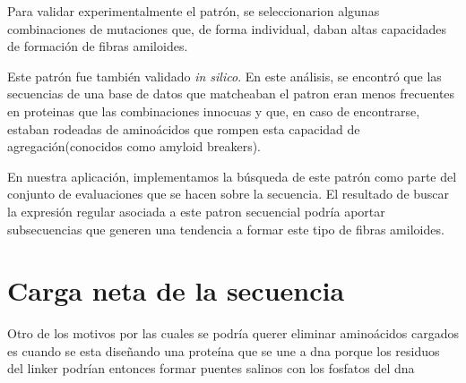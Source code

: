 % 



Para validar experimentalmente el patrón, se seleccionarion algunas combinaciones de mutaciones que, de forma individual, daban altas capacidades de formación de fibras amiloides. 

Este patrón fue también validado \textit{in silico}. En este análisis, se encontró que las secuencias de una base de datos que matcheaban el patron eran menos frecuentes en proteinas que las combinaciones innocuas y que, en caso de encontrarse, estaban rodeadas de aminoácidos que 
rompen esta capacidad de agregación(conocidos como amyloid breakers).



En nuestra aplicación, implementamos la búsqueda de este patrón como parte del conjunto de evaluaciones que se hacen sobre la secuencia. El resultado de buscar la expresión regular asociada a este patron secuencial podría aportar subsecuencias
que generen una tendencia a formar este tipo de fibras amiloides.


\section{Carga neta de la secuencia}

Otro de los motivos por las cuales se podría querer eliminar aminoácidos cargados es cuando se esta diseñando una proteína que se une a dna porque los residuos del linker podrían 
entonces formar puentes salinos con los fosfatos del dna